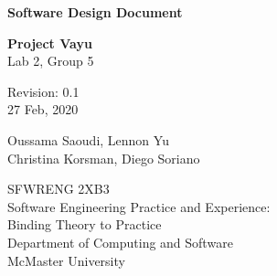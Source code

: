 \documentclass[12pt]{article}
\begin{document}


\begin{titlepage}
    \begin{center}
        \vspace*{1cm}
            
        \Huge
        \textbf{Software Design Document}

        \LARGE
        \vspace{0.5cm}
        \textbf{Project Vayu}\\
        \vspace{0.2cm}
        Lab 2, Group 5

        \vspace{0.5cm}
        Revision: 0.1\\
        \vspace{0.2cm}
        27 Feb, 2020
            
        \vspace{1.5cm}
            
        \Large
        Oussama Saoudi, Lennon Yu\\
        Christina Korsman, Diego Soriano

        \vfill
            
        \vspace{0.8cm}
                        
        \large
        SFWRENG 2XB3\\
        Software Engineering Practice and Experience:\\
        Binding Theory to Practice\\
        Department of Computing and Software\\
        McMaster University            
    \end{center}
\end{titlepage}
\end{document}

